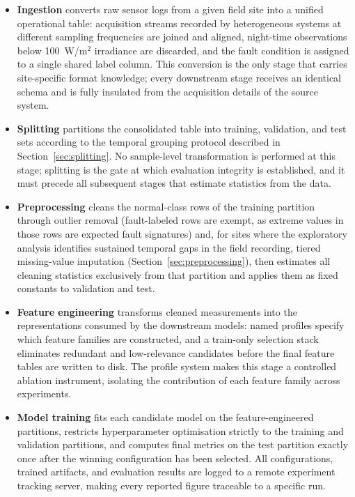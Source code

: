 \begin{itemize}
    \item \textbf{Ingestion} converts raw sensor logs from a given field site into a unified operational table: acquisition streams recorded by heterogeneous systems at different sampling frequencies are joined and aligned, night-time observations below 100~W/m$^2$ irradiance are discarded, and the fault condition is assigned to a single shared label column. This conversion is the only stage that carries site-specific format knowledge; every downstream stage receives an identical schema and is fully insulated from the acquisition details of the source system.
    \item \textbf{Splitting} partitions the consolidated table into training, validation, and test sets according to the temporal grouping protocol described in Section~\ref{sec:splitting}. No sample-level transformation is performed at this stage; splitting is the gate at which evaluation integrity is established, and it must precede all subsequent stages that estimate statistics from the data.
    \item \textbf{Preprocessing} cleans the normal-class rows of the training partition through outlier removal (fault-labeled rows are exempt, as extreme values in those rows are expected fault signatures) and, for sites where the exploratory analysis identifies sustained temporal gaps in the field recording, tiered missing-value imputation (Section~\ref{sec:preprocessing}), then estimates all cleaning statistics exclusively from that partition and applies them as fixed constants to validation and test.    \item \textbf{Feature engineering} transforms cleaned measurements into the representations consumed by the downstream models: named profiles specify which feature families are constructed, and a train-only selection stack eliminates redundant and low-relevance candidates before the final feature tables are written to disk. The profile system makes this stage a controlled ablation instrument, isolating the contribution of each feature family across experiments.
    \item \textbf{Model training} fits each candidate model on the feature-engineered partitions, restricts hyperparameter optimisation strictly to the training and validation partitions, and computes final metrics on the test partition exactly once after the winning configuration has been selected. All configurations, trained artifacts, and evaluation results are logged to a remote experiment tracking server, making every reported figure traceable to a specific run.
\end{itemize}

